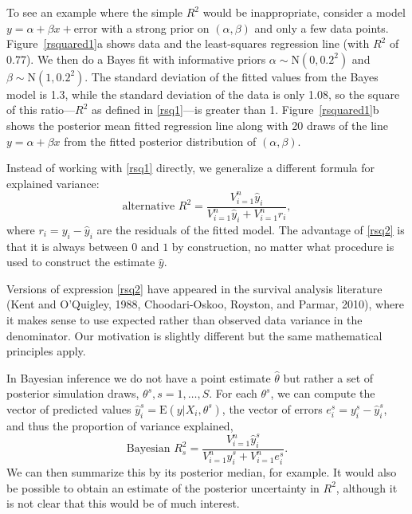 \documentclass[11pt]{article}
\begin{document}
To see an example where the simple $R^2$ would be inappropriate, consider a model
$y = \alpha + \beta x+\mbox{error}$
with a strong prior on $(\alpha,\beta)$ and only a few data points.
Figure~\ref{rsquared1}a shows data and the least-squares regression line (with
$R^2$ of 0.77).  We then do a Bayes fit with informative priors
$\alpha \sim \mbox{N}(0,0.2^2)$ and $\beta \sim \mbox{N}(1,0.2^2)$.  The
standard deviation of the fitted values from the Bayes model is 1.3, while the
standard deviation of the data is only 1.08, so the square of this
ratio---$R^2$ as defined in \eqref{rsq1}---is greater than 1.
Figure~\ref{rsquared1}b shows the posterior mean fitted regression line along
with 20 draws of the line $y = \alpha + \beta x$ from the fitted posterior
distribution of $(\alpha,\beta)$.

Instead of working with \eqref{rsq1} directly, we generalize a different formula
for explained variance:
%
\begin{equation}\label{rsq2}
\mbox{alternative } R^2 = \frac{V_{i=1}^n\hat{y}_i}{V_{i=1}^n \hat{y}_i  + V_{i=1}^n r_i},
\end{equation}
%
where $r_i = y_i -\hat{y}_i$ are the residuals of the fitted model.
The advantage of \eqref{rsq2} is that it is always between $0$ and $1$ by
construction, no matter what procedure is used to construct the estimate
$\hat{y}$.

Versions of expression \eqref{rsq2} have appeared in the survival analysis
literature (Kent and O'Quigley, 1988, Choodari-Oskoo, Royston, and Parmar,
2010), where it makes sense to use expected rather than observed data variance
in the denominator.  Our motivation is slightly different but the same
mathematical principles apply.

In Bayesian inference we do not have a point estimate $\hat{\theta}$ but rather
a set of posterior simulation draws, $\theta^s, s=1,\ldots,S$.
For each $\theta^s$, we can compute the vector of predicted values
$\hat{y}_i^s = \mbox{E}(y | X_i,\theta^s)$, the vector of errors
$e_i^s = y_i^s - \hat{y}_i^s$, and thus the proportion of variance explained,
%
\begin{equation}\label{rsq3}
\mbox{Bayesian } R^2_s=\frac{V_{i=1}^n\hat{y}_i^s}{V_{i=1}^n \hat{y}_i^s  + V_{i=1}^n e_i^s}.
\end{equation}
%
We can then summarize this by its posterior median, for example. It would also
be possible to obtain an estimate of the posterior uncertainty in $R^2$,
although it is not clear that this would be of much interest.
\end{document}
